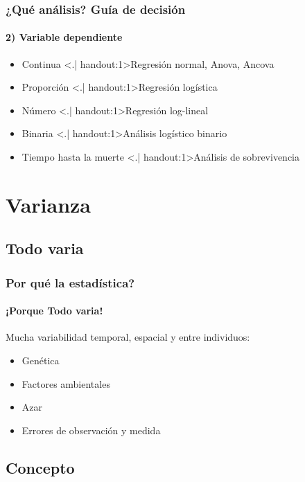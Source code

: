 \documentclass[gray,handout,mathserif]{beamer}
\begin{document}
\begin{frame}[label=whichan2]
\frametitle{¿Qu\'e an\'alisis? Gu\'ia de decisi\'on}
\framesubtitle{2) Variable dependiente}
 \begin{itemize}[<+-| handout:1>]
   \item Continua \hfill \alert<.| handout:1>{Regresi\'on normal, Anova, Ancova}
   \item Proporci\'on \hfill \alert<.| handout:1>{Regresi\'on log\'istica}
   \item N\'umero \hfill \alert<.| handout:1>{Regresi\'on log-lineal}
   \item Binaria \hfill \alert<.| handout:1>{An\'alisis log\'istico binario}
   \item Tiempo hasta la muerte \hfill \alert<.| handout:1>{An\'alisis de sobrevivencia}
\end{itemize}
\end{frame}%




\section[Varianza]{Varianza}

\subsection[Todo varia]{Todo varia}

\begin{frame}[label=allvaries]
  \frametitle{Por qu\'e la estad\'istica?}
  \framesubtitle{¡Porque Todo varia!}
  Mucha variabilidad temporal, espacial y entre individuos:
  \begin{itemize}
    \item Gen\'etica
    \item Factores ambientales
    \item Azar
    \item Errores de observaci\'on y medida
  \end{itemize}
\end{frame}%


\subsection[Concepto]{Concepto}
 
\end{document}
